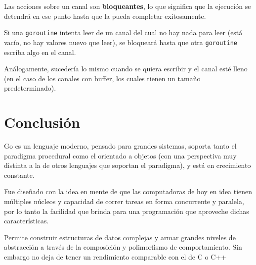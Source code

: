 Las acciones sobre un canal son \textbf{bloqueantes}, lo que significa que la ejecución se detendrá en ese punto hasta que la pueda completar exitosamente.

Si una \texttt{goroutine} intenta leer de un canal del cual no hay nada para leer (está vacío, no hay valores nuevo que leer), se bloqueará hasta que otra \texttt{goroutine} escriba algo en el canal.  

Análogamente, sucedería lo mismo cuando se quiera escribir y el canal esté lleno (en el caso de los canales con buffer, los cuales tienen un tamaño predeterminado).


\section{Conclusión}

Go es un lenguaje moderno, pensado para grandes sistemas, soporta tanto el paradigma procedural como el orientado a objetos (con una perspectiva muy distinta a la de otros lenguajes que soportan el paradigma), y está en crecimiento constante.

Fue diseñado con la idea en mente de que las computadoras de hoy en idea tienen múltiples núcleos y capacidad de correr tareas en forma concurrente y paralela, por lo tanto la facilidad que brinda para una programación que aproveche dichas características.

Permite construir estructuras de datos complejas y armar grandes niveles de abstracción a través de la composición y polimorfismo de comportamiento. Sin embargo no deja de tener un rendimiento comparable con el de C o C++ \autocite{TheWayToGo:Editors}













\clearpage
\printbibliography



